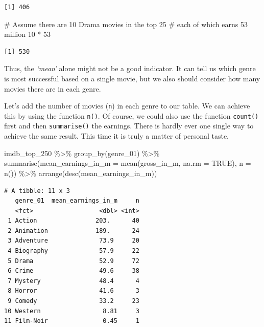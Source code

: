 \documentclass[
  letterpaper,
]{krantz}
\makeatletter
\newenvironment{Shaded}{\begin{snugshade}}{\end{snugshade}}
\newcommand{\AttributeTok}[1]{\textcolor[rgb]{0.40,0.45,0.13}{#1}}
\newcommand{\CommentTok}[1]{\textcolor[rgb]{0.37,0.37,0.37}{#1}}
\newcommand{\ConstantTok}[1]{\textcolor[rgb]{0.56,0.35,0.01}{#1}}
\newcommand{\DecValTok}[1]{\textcolor[rgb]{0.68,0.00,0.00}{#1}}
\newcommand{\FunctionTok}[1]{\textcolor[rgb]{0.28,0.35,0.67}{#1}}
\newcommand{\NormalTok}[1]{\textcolor[rgb]{0.00,0.23,0.31}{#1}}
\newcommand{\SpecialCharTok}[1]{\textcolor[rgb]{0.37,0.37,0.37}{#1}}
\newenvironment{kframe}{%
\medskip{}
\setlength{\fboxsep}{.8em}
 \def\at@end@of@kframe{}%
 \ifinner\ifhmode%
  \def\at@end@of@kframe{\end{minipage}}%
  \begin{minipage}{\columnwidth}%
 \fi\fi%
 \def\FrameCommand##1{\hskip\@totalleftmargin \hskip-\fboxsep
 \colorbox{shadecolor}{##1}\hskip-\fboxsep
     \hskip-\linewidth \hskip-\@totalleftmargin \hskip\columnwidth}%
 \MakeFramed {\advance\hsize-\width
   \@totalleftmargin\z@ \linewidth\hsize
   \@setminipage}}%
 {\par\unskip\endMakeFramed%
 \at@end@of@kframe}
\renewenvironment{Shaded}{\begin{kframe}}{\end{kframe}}
\makeatother
\begin{document}
\begin{verbatim}
[1] 406
\end{verbatim}

\begin{Shaded}
\begin{Highlighting}[]
\CommentTok{\# Assume there are 10 Drama movies in the top 25}
\CommentTok{\# each of which earns 53 million}
\DecValTok{10} \SpecialCharTok{*} \DecValTok{53}
\end{Highlighting}
\end{Shaded}

\begin{verbatim}
[1] 530
\end{verbatim}

Thus, the \emph{`mean'} alone might not be a good indicator. It can tell
us which genre is most successful based on a single movie, but we also
should consider how many movies there are in each genre.

Let's add the number of movies (\texttt{n}) in each genre to our table.
We can achieve this by using the function \texttt{n()}. Of course, we
could also use the function \texttt{count()} first and then
\texttt{summarise()} the earnings. There is hardly ever one single way
to achieve the same result. This time it is truly a matter of personal
taste.

\begin{Shaded}
\begin{Highlighting}[]
\NormalTok{imdb\_top\_250 }\SpecialCharTok{\%\textgreater{}\%}
  \FunctionTok{group\_by}\NormalTok{(genre\_01) }\SpecialCharTok{\%\textgreater{}\%}
  \FunctionTok{summarise}\NormalTok{(}\AttributeTok{mean\_earnings\_in\_m =} \FunctionTok{mean}\NormalTok{(gross\_in\_m, }\AttributeTok{na.rm =} \ConstantTok{TRUE}\NormalTok{),}
            \AttributeTok{n =} \FunctionTok{n}\NormalTok{()) }\SpecialCharTok{\%\textgreater{}\%}
  \FunctionTok{arrange}\NormalTok{(}\FunctionTok{desc}\NormalTok{(mean\_earnings\_in\_m))}
\end{Highlighting}
\end{Shaded}

\begin{verbatim}
# A tibble: 11 x 3
   genre_01  mean_earnings_in_m     n
   <fct>                  <dbl> <int>
 1 Action                203.      40
 2 Animation             189.      24
 3 Adventure              73.9     20
 4 Biography              57.9     22
 5 Drama                  52.9     72
 6 Crime                  49.6     38
 7 Mystery                48.4      4
 8 Horror                 41.6      3
 9 Comedy                 33.2     23
10 Western                 8.81     3
11 Film-Noir               0.45     1
\end{verbatim}
\end{document}
